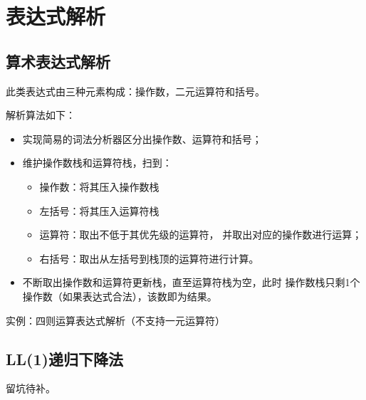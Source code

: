 \section{表达式解析}
\subsection{算术表达式解析}
此类表达式由三种元素构成：操作数，二元运算符和括号。

解析算法如下：
\begin{itemize}
	\item 实现简易的词法分析器区分出操作数、运算符和括号；
	\item 维护操作数栈和运算符栈，扫到：
	      \begin{itemize}
		      \item 操作数：将其压入操作数栈
		      \item 左括号：将其压入运算符栈
		      \item 运算符：取出不低于其优先级的运算符，
		            并取出对应的操作数进行运算；
		      \item 右括号：取出从左括号到栈顶的运算符进行计算。
	      \end{itemize}
	\item 不断取出操作数和运算符更新栈，直至运算符栈为空，此时
	      操作数栈只剩1个操作数（如果表达式合法），该数即为结果。
\end{itemize}

实例：四则运算表达式解析（不支持一元运算符）

\subsection{LL(1)递归下降法}
留坑待补。
